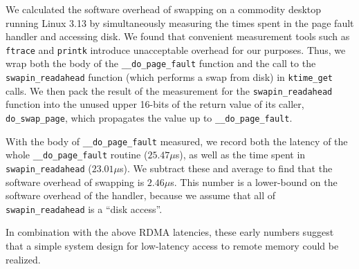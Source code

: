 We calculated the software overhead of swapping on a commodity desktop running Linux 3.13 by simultaneously measuring the times spent in the page fault handler and accessing disk. 
We found that convenient measurement tools such as \texttt{ftrace} and \texttt{printk} introduce unacceptable overhead for our purposes. 
Thus, we wrap both the body of the \texttt{\_\_do\_page\_fault} function and the call to the \texttt{swapin\_readahead} function (which performs a swap from disk) in \texttt{ktime\_get} calls.  
We then pack the result of the measurement for the \texttt{swapin\_readahead} function into the unused upper 16-bits of the return value of its caller, \texttt{do\_swap\_page}, which propagates the value up to \texttt{\_\_do\_page\_fault}. 

With the body of \texttt{\_\_do\_page\_fault} measured, we record both the latency of the whole \texttt{\_\_do\_page\_fault} routine ($25.47 \mu$s), as well as the time spent in \texttt{swapin\_readahead} ($23.01 \mu$s). 
We subtract these and average to find that the software overhead of swapping is $2.46 \mu$s. 
This number is a lower-bound on the software overhead of the handler, because we assume that all of \texttt{swapin\_readahead} is a ``disk access''.%

In combination with the above RDMA latencies, these early numbers suggest that a simple system design for low-latency access to remote memory could be realized. 


